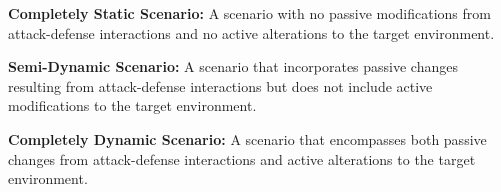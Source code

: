 \textbf{Completely Static Scenario:} A scenario with no passive modifications from attack-defense interactions and no active alterations to the target environment.

\textbf{Semi-Dynamic Scenario:} A scenario that incorporates passive changes resulting from attack-defense interactions but does not include active modifications to the target environment.

\textbf{Completely Dynamic Scenario:} A scenario that encompasses both passive changes from attack-defense interactions and active alterations to the target environment.


